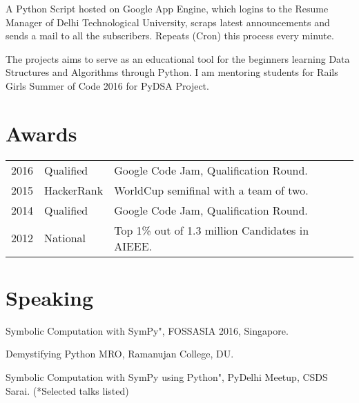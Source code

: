 \documentclass[]{deedy-resume-openfont}
\begin{document}
\begin{minipage}[t]{0.66\textwidth}
A Python Script hosted on Google App Engine, which logins to the Resume Manager of Delhi Technological University, scraps latest announcements and sends a mail to all the subscribers. Repeats (Cron) this process every minute.
\sectionsep

The projects aims to serve as an educational tool for the beginners learning Data Structures and Algorithms through Python. I am mentoring students for Rails Girls Summer of Code 2016 for PyDSA Project.

\sectionsep


\section{Awards} 
\begin{tabular}{rll}
2016	     & Qualified  & Google Code Jam, Qualification Round.\\
2015	     & HackerRank  & WorldCup semifinal with a team of two.\\
2014	     & Qualified  & Google Code Jam, Qualification Round.\\
2012     & National & Top 1\% out of 1.3 million Candidates in AIEEE.\\
\end{tabular}
\sectionsep


\section{Speaking}
\begin{tightemize}
\item Symbolic Computation with SymPy", FOSSASIA 2016, Singapore.\\
\item Demystifying Python MRO, Ramanujan College, DU.
\item Symbolic Computation with SymPy using Python", PyDelhi Meetup, CSDS Sarai. (*Selected talks listed)
\end{tightemize}



\end{minipage}
\end{document}
